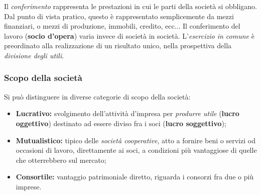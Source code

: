 \documentclass[a4paper,11pt]{article}
\begin{document}
Il \textit{conferimento} rappresenta le prestazioni in cui le parti della società si obbligano.
Dal punto di vista pratico, questo è rappresentato semplicemente da mezzi finanziari, o mezzi di produzione, immobili, credito, ecc...
Il conferimento del lavoro (\textbf{socio d'opera}) varia invece di società in società.
L'\textit{esercizio in comune} è preordinato alla realizzazione di un risultato unico, nella prospettiva della \textit{divisione degli utili}. 

\subsubsection{Scopo della società}
Si può distinguere in diverse categorie di scopo della società:
\begin{itemize}
	\item \textbf{Lucrativo:} svolgimento dell'attività d'impresa per \textit{produrre utile} (\textbf{lucro oggettivo}) destinato ad essere diviso fra i soci (\textbf{lucro soggettivo});
	\item \textbf{Mutualistico:} tipico delle \textit{società cooperative}, atto a fornire beni o servizi od occasioni di lavoro, direttamente ai soci, a condizioni più vantaggiose di quelle che otterrebbero sul mercato;
	\item \textbf{Consortile:} vantaggio patrimoniale diretto, riguarda i consorzi fra due o più imprese.
\end{itemize}
\end{document}
